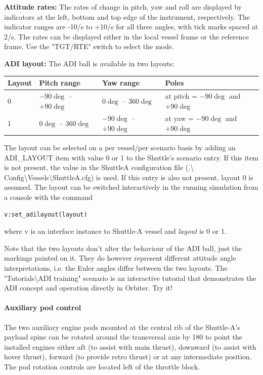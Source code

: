 \documentclass[Orbiter User Manual.tex]{subfiles}
\begin{document}
\textbf{Attitude rates:}
The rates of change in pitch, yaw and roll are displayed by indicators at the
left, bottom and top edge of the instrument, respectively. The indicator ranges
are -10\deg/s to +10\deg/s for all three angles, with tick marks spaced at
2\deg/s. The rates can be displayed either in the local vessel frame or the
reference frame. Use the "TGT/RTE" switch to select the mode.

\textbf{ADI layout:}
The ADI ball is available in two layouts:

	\begin{longtable}{ p{} p{} p{}
		p{} }
	\hline
	\textbf{Layout} & \textbf{Pitch range} & \textbf{Yaw range} &
		\textbf{Poles}\\
	\hline
	0 & $-90\deg{}$ -- $+90\deg{}$ & $0\deg{}$ -- $360\deg{}$ & at pitch =
		$-90\deg{}$ and $+90\deg{}$\\
	\hline
	1 & $0\deg{}$ -- $360\deg{}$ & $-90\deg{}$ -- $+90\deg{}$ & at yaw =
		$-90\deg{}$ and $+90\deg{}$\\
	\hline
	\end{longtable}

The layout can be selected on a per vessel/per scenario basis by adding an
ADI\_LAYOUT item with value 0 or 1 to the Shuttle's scenario entry. If this item
is not present, the value in the ShuttleA configuration file (.\textbackslash
Config\textbackslash Vessels\textbackslash ShuttleA.cfg) is used. If this entry
is also not present, layout 0 is assumed. The layout can be switched
interactively in the running simulation from a console with the command

\begin{lstlisting}[language=OSFS]
v:set_adilayout(layout)
\end{lstlisting}

where v is an interface instance to Shuttle-A vessel and \emph{layout} is 0 or
1.

Note that the two layouts don't alter the behaviour of the ADI ball, just the
markings painted on it. They do however represent different attitude angle
interpretations, i.e. the Euler angles differ between the two layouts. The
"Tutorials\textbackslash ADI training" scenario is an interactive tutorial that
demonstrates the ADI concept and operation directly in Orbiter. Try it!

\paragraph{Auxiliary pod control}
The two auxiliary engine pods mounted at the central rib of the Shuttle-A's
payload spine can be rotated  around the transversal axis by 180\deg{} to point
the installed engines either aft (to assist with main thrust), downward (to
assist with hover thrust), forward (to provide retro thrust) or at any
intermediate position. The pod rotation controls are located left of the
throttle block.
\end{document}
